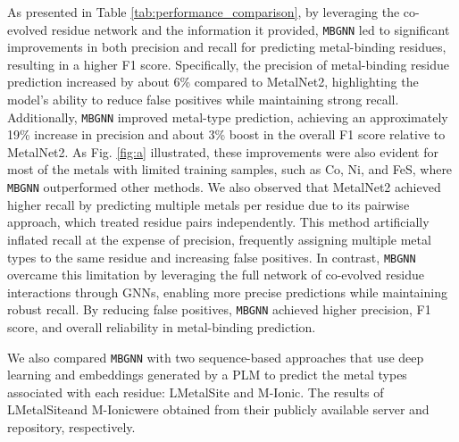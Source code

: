 \documentclass[letterpaper, 10 pt, conference]{ieeeconf}
\begin{document}


As presented in Table \ref{tab:performance_comparison}, by leveraging the co-evolved residue network and the information it provided, \texttt{MBGNN} led to significant improvements in both precision and recall for predicting metal-binding residues, resulting in a higher F1 score. Specifically, the precision of metal-binding residue prediction increased by about 6\% compared to MetalNet2, highlighting the model’s ability to reduce false positives while maintaining strong recall. Additionally, \texttt{MBGNN} improved metal-type prediction, achieving an approximately 19\% increase in precision and about 3\% boost in the overall F1 score relative to MetalNet2. As Fig. \ref{fig:a} illustrated, these improvements were also evident for most of the metals with limited training samples, such as Co, Ni, and FeS, where \texttt{MBGNN} outperformed other methods. We also observed that MetalNet2 achieved higher recall by predicting multiple metals per residue due to its pairwise approach, which treated residue pairs independently. This method artificially inflated recall at the expense of precision, frequently assigning multiple metal types to the same residue and increasing false positives. In contrast, \texttt{MBGNN} overcame this limitation by leveraging the full network of co-evolved residue interactions through GNNs, enabling more precise predictions while maintaining robust recall. By reducing false positives, \texttt{MBGNN} achieved higher precision, F1 score, and overall reliability in metal-binding prediction.

We also compared \texttt{MBGNN} with two sequence-based approaches that use deep learning and embeddings generated by a PLM to predict the metal types associated with each residue: LMetalSite\cite{lmetalsite} and M-Ionic\cite{mionic}. The results of LMetalSite\protect\footnotemark[1] and M-Ionic\protect\footnotemark[2] were obtained from their publicly available server and repository, respectively.

\end{document}
